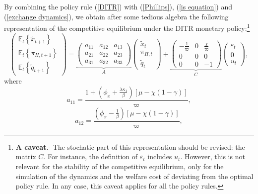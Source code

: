 \documentclass{article}
\begin{document}
By combining the policy rule (\ref{DITR}) with (\ref{Phillips}), (\ref{is
equation}) and (\ref{exchange dynamics}), we obtain after some tedious
algebra the following representation of the competitive equilibrium under
the DITR monetary policy:\footnote{\textbf{A caveat}.- The stochatic part of
this representation should be revised: the matrix $C.$ For instance, the
definition of $\varepsilon _{t}$ includes $u_{t}.$ However, this is not
relevant for the stability of the competitive equilibrium, only for the
simulation of the dynamics and the welfare cost of deviating from the
optimal policy rule. In any case, this caveat applies for all the policy
rules.}%
\begin{equation}
\left( 
\begin{array}{c}
\mathbb{E}_{t}\left\{ \widetilde{x}_{t+1}\right\} \\ 
\mathbb{E}_{t}\left\{ \pi _{H,t+1}\right\} \\ 
\mathbb{E}_{t}\left\{ \widetilde{q}_{t+1}\right\}%
\end{array}%
\right) =\underset{A}{\underbrace{\left( 
\begin{array}{ccc}
a_{11} & a_{12} & a_{13} \\ 
a_{21} & a_{22} & a_{23} \\ 
a_{31} & a_{32} & a_{33}%
\end{array}%
\right) }}\left( 
\begin{array}{c}
\widetilde{x}_{t} \\ 
\pi _{H,t} \\ 
\widetilde{q}_{t}%
\end{array}%
\right) +\underset{C}{\underbrace{\left( 
\begin{array}{ccc}
-\frac{1}{\varpi } & 0 & \frac{\chi }{\varpi } \\ 
0 & 0 & 0 \\ 
0 & 0 & -1%
\end{array}%
\right) }}\left( 
\begin{array}{c}
\varepsilon _{t} \\ 
0 \\ 
u_{t}%
\end{array}%
\right) ,  \label{DITR solution}
\end{equation}%
where%
\begin{equation*}
a_{11}=\frac{1+\left( \phi _{x}+\frac{\lambda \kappa _{1}}{\beta }\right) %
\left[ \mu -\chi \left( 1-\gamma \right) \right] }{\varpi },
\end{equation*}%
\begin{equation*}
a_{12}=\frac{\left( \phi _{\pi }-\frac{1}{\beta }\right) \left[ \mu -\chi
\left( 1-\gamma \right) \right] }{\varpi },
\end{equation*}%
\end{document}
